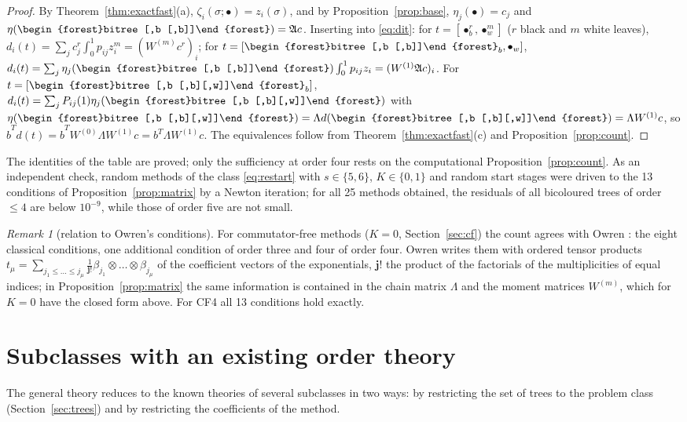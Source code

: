 \documentclass[11pt,a4paper]{article}
\theoremstyle{definition}
\theoremstyle{remark}
\newtheorem{remark}[theorem]{Remark}
\newcommand{\btree}[1]{\begin{forest}bitree #1\end{forest}}
\newcommand{\Tbb}{\btree{[,b [,b]]}}
\newcommand{\Tbbw}{\btree{[,b [,b][,w]]}}
\begin{document}
\begin{proof}
By Theorem~\ref{thm:exactfast}(a), $\zeta_i(\sigma;\bullet)=z_i(\sigma)$, and by Proposition~\ref{prop:base},
$\eta_j(\bullet)=c_j$ and $\eta(\Tbb)=\mathfrak Ac$. Inserting into \eqref{eq:dit}: for $t=[\bullet_b^r,\bullet_w^m]$
($r$ black and $m$ white leaves), $d_i(t)=\sum_jc_j^r\int_0^1p_{ij}z_i^m=(W^{(m)}c^r)_i$; for $t=[\Tbb_b,\bullet_w]$,
$d_i(t)=\sum_j\eta_j(\Tbb)\int_0^1p_{ij}z_i=(W^{(1)}\mathfrak Ac)_i$. For $t=[\Tbbw_b]$, $d_i(t)=\sum_jP_{ij}(1)\eta_j(\Tbbw)$
with $\eta(\Tbbw)=\Lambda d(\Tbbw)=\Lambda W^{(1)}c$, so $\hat b^Td(t)=\hat b^TW^{(0)}\Lambda W^{(1)}c=b^T\Lambda W^{(1)}c$. The
equivalences follow from Theorem~\ref{thm:exactfast}(c) and Proposition~\ref{prop:count}.
\end{proof}

The identities of the table are proved; only the sufficiency at order four rests on the computational
Proposition~\ref{prop:count}. As an independent check, random methods of the class \eqref{eq:restart} with
$s\in\{5,6\}$, $K\in\{0,1\}$ and random start stages were driven to the 13 conditions of Proposition~\ref{prop:matrix}
by a Newton iteration; for all 25 methods obtained, the residuals of all bicoloured trees of order $\le4$ are below
$10^{-9}$, while those of order five are not small.

\begin{remark}[relation to Owren's conditions]
For commutator-free methods ($K=0$, Section~\ref{sec:cf}) the count agrees with Owren \cite{Owren2006}: the eight classical
conditions, one additional condition of order three and four of order four. Owren writes them with ordered tensor products
$t_\mu=\sum_{j_1\le\dots\le j_\mu}\frac1{\mathbf j!}\beta_{j_1}\otimes\dots\otimes\beta_{j_\mu}$ of the coefficient vectors of
the exponentials, $\mathbf j!$ the product of the factorials of the multiplicities of equal indices; in Proposition~\ref{prop:matrix} the same information is contained in the chain matrix $\Lambda$ and the
moment matrices $W^{(m)}$, which for $K=0$ have the closed form above. For CF4 all 13 conditions hold exactly.
\end{remark}

\section{Subclasses with an existing order theory}
\label{sec:subclasses}

The general theory reduces to the known theories of several subclasses in two ways: by restricting the set of trees to
the problem class (Section~\ref{sec:trees}) and by restricting the coefficients of the method.
\end{document}
